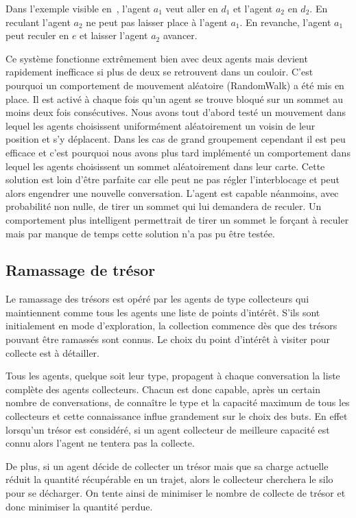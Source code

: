 \documentclass[11pt]{article}
\begin{document}
Dans l'exemple visible en~, l'agent $a_1$ veut aller en $d_1$ et l'agent $a_2$ en $d_2$. En reculant l'agent $a_2$ ne peut pas laisser place à l'agent $a_1$. En revanche, l'agent $a_1$ peut reculer en $e$ et laisser l'agent $a_2$ avancer.

Ce système fonctionne extrêmement bien avec deux agents mais devient rapidement inefficace si plus de deux se retrouvent dans un couloir. C'est pourquoi un comportement de mouvement aléatoire (\textsf{RandomWalk}) a été mis en place. Il est activé à chaque fois qu'un agent se trouve bloqué sur un sommet au moins deux fois consécutives. Nous avons tout d'abord testé un mouvement dans lequel les agents choisissent uniformément aléatoirement un voisin de leur position et s'y déplacent. Dans les cas de grand groupement cependant il est peu efficace et c'est pourquoi nous avons plus tard implémenté un comportement  dans lequel les agents choisissent un sommet aléatoirement dans leur carte. Cette solution est loin d'être parfaite car elle peut ne pas régler l'interblocage et peut alors engendrer une nouvelle conversation. L'agent est capable néanmoins, avec probabilité non nulle, de tirer un sommet qui lui demandera de reculer. Un comportement plus intelligent permettrait de tirer un sommet le forçant à reculer mais par manque de temps cette solution n'a pas pu être testée.

\subsection{Ramassage de trésor}

Le ramassage des trésors est opéré par les agents de type collecteurs qui maintiennent comme tous les agents une liste de points d'intérêt. S'ils sont initialement en mode d'exploration, la collection commence dès que des trésors pouvant être ramassés sont connus. Le choix du point d'intérêt à visiter pour collecte est à détailler.

Tous les agents, quelque soit leur type, propagent à chaque conversation la liste complète des agents collecteurs. Chacun est donc capable, après un certain nombre de conversations, de connaître le type et la capacité maximum de tous les collecteurs et cette connaissance influe grandement sur le choix des buts. En effet lorsqu'un trésor est considéré, si un agent collecteur de meilleure capacité est connu alors l'agent ne tentera pas la collecte.

De plus, si un agent décide de collecter un trésor mais que sa charge actuelle réduit la quantité récupérable en un trajet, alors le collecteur cherchera le silo pour se décharger. On tente ainsi de minimiser le nombre de collecte de trésor et donc minimiser la quantité perdue.\\ 
\end{document}

